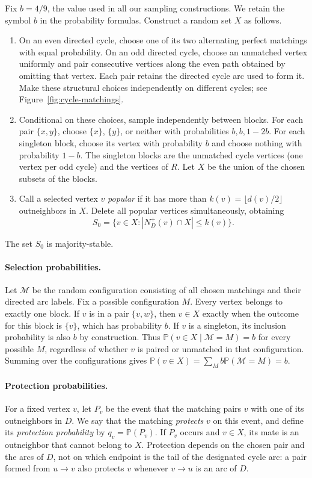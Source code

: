 \documentclass[12pt]{article}
\newcommand{\Pp}{\mathbb P}
\newcommand{\abs}[1]{|#1|}
\begin{document}
Fix \(b=4/9\), the value used in all our sampling constructions. We retain the symbol \(b\) in the probability formulas. Construct a random set \(X\) as follows.
\begin{enumerate}
\item On an even directed cycle, choose one of its two alternating perfect matchings with equal probability. On an odd directed cycle, choose an unmatched vertex uniformly and pair consecutive vertices along the even path obtained by omitting that vertex. Each pair retains the directed cycle arc used to form it. Make these structural choices independently on different cycles; see Figure~\ref{fig:cycle-matchings}.
\item Conditional on these choices, sample independently between blocks. For each pair \(\{x,y\}\), choose \(\{x\}\), \(\{y\}\), or neither with probabilities \(b,b,1-2b\). For each singleton block, choose its vertex with probability \(b\) and choose nothing with probability \(1-b\). The singleton blocks are the unmatched cycle vertices (one vertex per odd cycle) and the vertices of \(R\). Let \(X\) be the union of the chosen subsets of the blocks.
\item Call a selected vertex \(v\) \emph{popular} if it has more than \(k(v) = \lfloor d(v)/2 \rfloor\) outneighbors in \(X\). Delete all popular vertices simultaneously, obtaining
\begin{equation}\label{eq:deletion}
S_0=\{v\in X:\abs{N_D^+(v)\cap X}\le k(v)\}.
\end{equation}
\end{enumerate}
The set \(S_0\) is majority-stable.

\paragraph{Selection probabilities.}
Let \(\mathcal M\) be the random configuration consisting of all chosen matchings and their directed arc labels. Fix a possible configuration \(M\). Every vertex belongs to exactly one block. If \(v\) is in a pair \(\{v,w\}\), then \(v\in X\) exactly when the outcome for this block is \(\{v\}\), which has probability \(b\). If \(v\) is a singleton, its inclusion probability is also \(b\) by construction. Thus \(\Pp(v\in X\mid\mathcal M=M)=b\) for every possible \(M\), regardless of whether \(v\) is paired or unmatched in that configuration. Summing over the configurations gives \(\Pp(v\in X)=\sum_M b\Pp(\mathcal M=M)=b\).

\paragraph{Protection probabilities.}
For a fixed vertex \(v\), let \(P_v\) be the event that the matching pairs \(v\) with one of its outneighbors in \(D\). We say that the matching \emph{protects} \(v\) on this event, and define its \emph{protection probability} by \(q_v=\Pp(P_v)\). If \(P_v\) occurs and \(v\in X\), its mate is an outneighbor that cannot belong to \(X\). Protection depends on the chosen pair and the arcs of \(D\), not on which endpoint is the tail of the designated cycle arc: a pair formed from \(u\to v\) also protects \(v\) whenever \(v\to u\) is an arc of \(D\).
\end{document}
